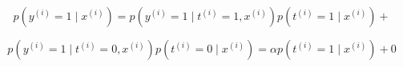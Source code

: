 \begin{answer}

\begin{equation*}
p(y^{(i)}=1\mid x^{(i)}) = p(y^{(i)}=1\mid t^{(i)}=1,x^{(i)}) p(t^{(i)}=1\mid x^{(i)}) +
\end{equation*}


\begin{equation*}
p(y^{(i)}=1\mid t^{(i)}=0,x^{(i)}) p(t^{(i)}=0\mid x^{(i)}) = \alpha p(t^{(i)}=1\mid x^{(i)}) + 0
\end{equation*}

\end{answer}
